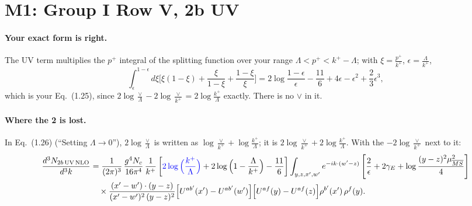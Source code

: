 \documentclass[10pt]{article}
\newcommand{\new}[1]{{\color{blue}#1}}
\begin{document}
\section{M1: Group I Row V, 2b UV}\label{sec:M1}
\paragraph{Your exact form is right.} The UV term multiplies the $p^+$ integral of the splitting function over your range $\Lambda<p^+<k^+-\Lambda$; with $\xi=\frac{p^+}{k^+}$, $\epsilon=\frac{\Lambda}{k^+}$,
\begin{equation*}
\int_\epsilon^{1-\epsilon}d\xi\Big[\xi(1-\xi)+\frac{\xi}{1-\xi}+\frac{1-\xi}{\xi}\Big]=2\log\frac{1-\epsilon}{\epsilon}-\frac{11}{6}+4\epsilon-\epsilon^2+\frac{2}{3}\epsilon^3 ,
\end{equation*}
which is your Eq.~(1.25), since $2\log\frac{\vee}{\Lambda}-2\log\frac{\vee}{k^+}=2\log\frac{k^+}{\Lambda}$ exactly. There is no $\vee$ in it.
\paragraph{Where the 2 is lost.} In Eq.~(1.26) (``Setting $\Lambda\to0$''), $2\log\frac{\vee}{\Lambda}$ is written as $\log\frac{\vee}{k^+}+\log\frac{k^+}{\Lambda}$; it is $2\log\frac{\vee}{k^+}+2\log\frac{k^+}{\Lambda}$. With the $-2\log\frac{\vee}{k^+}$ next to it:
\begin{align*}
\frac{d^{3}N_{2b\,\rm UV\, NLO}}{d^{3}k} &= \frac{1}{(2\pi)^{3}}\,\frac{g^{4}N_{c}}{16\pi^{4}}\,\frac{1}{k^{+}}\left[\new{2\log\Big(\frac{k^{+}}{\Lambda}\Big)}+2\log\Big(1-\frac{\Lambda}{k^{+}}\Big)-\frac{11}{6}\right]\int_{y,z,x',w'}e^{-ik\cdot(w'-z)}\left[\frac{2}{\epsilon}+2\gamma_{E}+\log\frac{(y-z)^{2}\mu^{2}_{\overline{MS}}}{4}\right]\\
&\quad\times\frac{(x'-w')\cdot(y-z)}{(x'-w')^{2}\,(y-z)^{2}}\Big[U^{ab'}(x')-U^{ab'}(w')\Big]\Big[U^{af}(y)-U^{af}(z)\Big]\rho^{b'}(x')\,\rho^{f}(y).
\end{align*}
\end{document}
